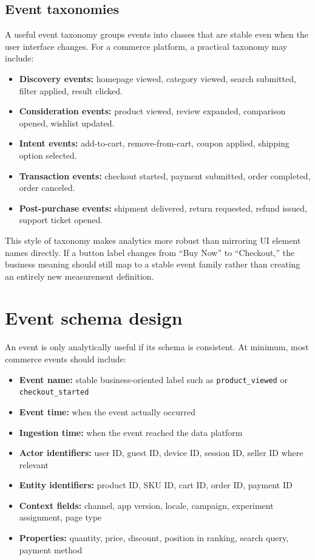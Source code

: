 \subsection{Event taxonomies}
A useful event taxonomy groups events into classes that are stable even when the user interface changes.
For a commerce platform, a practical taxonomy may include:
\begin{itemize}
  \item \textbf{Discovery events:} homepage viewed, category viewed, search submitted, filter applied, result clicked.
  \item \textbf{Consideration events:} product viewed, review expanded, comparison opened, wishlist updated.
  \item \textbf{Intent events:} add-to-cart, remove-from-cart, coupon applied, shipping option selected.
  \item \textbf{Transaction events:} checkout started, payment submitted, order completed, order canceled.
  \item \textbf{Post-purchase events:} shipment delivered, return requested, refund issued, support ticket opened.
\end{itemize}

This style of taxonomy makes analytics more robust than mirroring UI element names directly.
If a button label changes from ``Buy Now'' to ``Checkout,'' the business meaning should still map to a stable event family rather than creating an entirely new measurement definition.

\section{Event schema design}
An event is only analytically useful if its schema is consistent.
At minimum, most commerce events should include:
\begin{itemize}
  \item \textbf{Event name:} stable business-oriented label such as \texttt{product\_viewed} or \texttt{checkout\_started}
  \item \textbf{Event time:} when the event actually occurred
  \item \textbf{Ingestion time:} when the event reached the data platform
  \item \textbf{Actor identifiers:} user ID, guest ID, device ID, session ID, seller ID where relevant
  \item \textbf{Entity identifiers:} product ID, SKU ID, cart ID, order ID, payment ID
  \item \textbf{Context fields:} channel, app version, locale, campaign, experiment assignment, page type
  \item \textbf{Properties:} quantity, price, discount, position in ranking, search query, payment method
\end{itemize}

